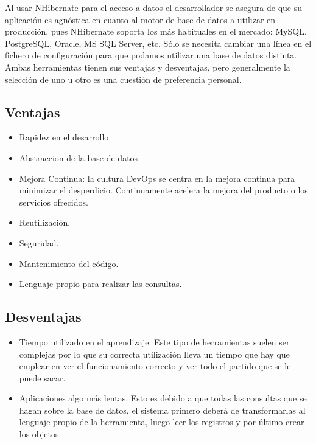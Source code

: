 \documentclass[preprint,12pt]{elsarticle}
\begin{document}
Al usar NHibernate para el acceso a datos el desarrollador se asegura de que su aplicación es agnóstica en cuanto al motor de base de datos a utilizar en producción, pues NHibernate soporta los más habituales en el mercado: MySQL, PostgreSQL, Oracle, MS SQL Server, etc. Sólo se necesita cambiar una línea en el fichero de configuración para que podamos utilizar una base de datos distinta. Ambas herramientas tienen sus ventajas y desventajas, pero generalmente la selección de uno u otro es una cuestión de preferencia personal.\cite{referenciaQuispe1}
\\



\subsection{Ventajas}

\begin{itemize}
\item Rapidez en el desarrollo 
\item Abstraccion de la base de datos 
\item Mejora Continua: la cultura DevOps se centra en la mejora continua para minimizar el desperdicio. Continuamente acelera la mejora del producto o los servicios ofrecidos.
\item Reutilización.
\item Seguridad.
\item Mantenimiento del código.
\item Lenguaje propio para realizar las consultas.
\end{itemize}\cite{referenciaSandoval1}




\subsection{Desventajas}
\begin{itemize}
\item Tiempo utilizado en el aprendizaje. Este tipo de herramientas suelen ser complejas por lo que su correcta utilización lleva un tiempo que hay que emplear en ver el funcionamiento correcto y ver todo el partido que se le puede sacar. 

\item Aplicaciones algo más lentas. Esto es debido a que todas las consultas que se hagan sobre la base de datos, el sistema primero deberá de transformarlas al lenguaje propio de la herramienta, luego leer los registros y por último crear los objetos.\cite{referenciaSandoval2}

\end{itemize}
\end{document}
